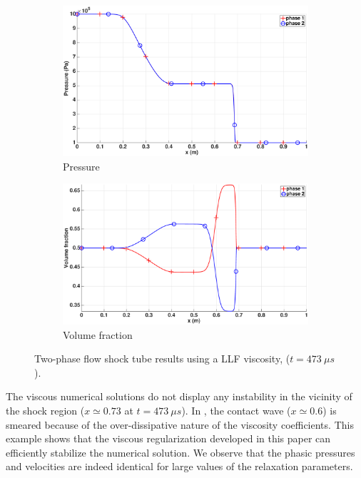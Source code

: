 \begin{figure}[H]
        \begin{subfigure}[b]{0.495\textwidth}
                \centering
                \includegraphics[width=\textwidth]{figures/relaxation_two_phases_pressure.eps}                
                \caption{Pressure}
                \label{fig:two-phase-press}
        \end{subfigure}        
        \begin{subfigure}[b]{0.495\textwidth}
                \centering
                \includegraphics[width=\textwidth]{figures/relaxation_two_phases_volume_fraction.eps}                
                \caption{Volume fraction}
                \label{fig:two-phase-vf}
        \end{subfigure}
        \caption{Two-phase flow shock tube results using a LLF viscosity, ($t=473 \ \mu s$).}\label{fig:two-phase}
\end{figure}
%
The viscous numerical solutions do not display any instability in the vicinity of the shock region ($x \simeq 0.73$ at $t=473 \ \mu s$). In , the contact wave ($x \simeq 0.6$) is smeared 
because of the over-dissipative nature of the viscosity coefficients. This example shows that the viscous regularization developed in this paper can efficiently stabilize the numerical solution.
We observe that the phasic pressures and velocities are indeed identical for large values of the relaxation parameters.
%

